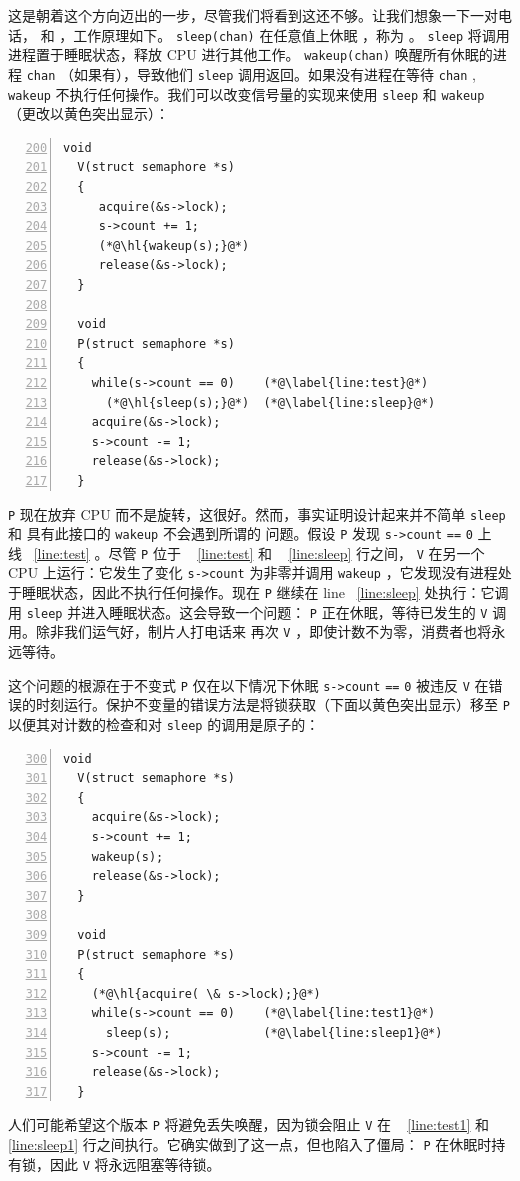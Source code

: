 \documentclass[UTF8]{article}
\begin{document}
这是朝着这个方向迈出的一步，尽管我们将看到这还不够。让我们想象一下一对电话，
        和
        ，工作原理如下。
    \lstinline{sleep(chan)}    在任意值上休眠
        ，称为
        。
    \lstinline{sleep}    将调用进程置于睡眠状态，释放 CPU 进行其他工作。
    \lstinline{wakeup(chan)}    唤醒所有休眠的进程
    \lstinline{chan}   （如果有），导致他们
    \lstinline{sleep}    调用返回。如果没有进程在等待
    \lstinline{chan}    ,
    \lstinline{wakeup}    不执行任何操作。我们可以改变信号量的实现来使用
    \lstinline{sleep}    和
    \lstinline{wakeup}   （更改以黄色突出显示）：
    \begin{lstlisting}[numbers=left,firstnumber=200]
  void
  V(struct semaphore *s)
  {
     acquire(&s->lock);
     s->count += 1;
     (*@\hl{wakeup(s);}@*)
     release(&s->lock);
  }
  
  void
  P(struct semaphore *s)
  {
    while(s->count == 0)    (*@\label{line:test}@*)
      (*@\hl{sleep(s);}@*)  (*@\label{line:sleep}@*)
    acquire(&s->lock);
    s->count -= 1;
    release(&s->lock);
  }
\end{lstlisting}     

   \lstinline{P}    现在放弃 CPU 而不是旋转，这很好。然而，事实证明设计起来并不简单
    \lstinline{sleep}    和
 具有此接口的    \lstinline{wakeup}    不会遇到所谓的        问题。假设
    \lstinline{P}    发现
    \lstinline{s->count}   
    \lstinline{==}   
    \lstinline{0}    上线~    \ref{line:test}    。尽管
    \lstinline{P}    位于 ~    \ref{line:test}    和 ~    \ref{line:sleep}    行之间，
    \lstinline{V}    在另一个 CPU 上运行：它发生了变化
    \lstinline{s->count}    为非零并调用
    \lstinline{wakeup}    ，它发现没有进程处于睡眠状态，因此不执行任何操作。现在
    \lstinline{P}    继续在 line~    \ref{line:sleep}    处执行：它调用
    \lstinline{sleep}    并进入睡眠状态。这会导致一个问题：
    \lstinline{P}    正在休眠，等待已发生的    \lstinline{V}    调用。除非我们运气好，制片人打电话来
 再次    \lstinline{V}   ，即使计数不为零，消费者也将永远等待。  

这个问题的根源在于不变式
    \lstinline{P}    仅在以下情况下休眠
    \lstinline{s->count}   
    \lstinline{==}   
    \lstinline{0}    被违反
    \lstinline{V}    在错误的时刻运行。保护不变量的错误方法是将锁获取（下面以黄色突出显示）移至
    \lstinline{P}    以便其对计数的检查和对    \lstinline{sleep}    的调用是原子的：
    \begin{lstlisting}[numbers=left,firstnumber=300]
  void
  V(struct semaphore *s)
  {
    acquire(&s->lock);
    s->count += 1;
    wakeup(s);
    release(&s->lock);
  }
  
  void
  P(struct semaphore *s)
  {
    (*@\hl{acquire( \& s->lock);}@*)
    while(s->count == 0)    (*@\label{line:test1}@*)
      sleep(s);             (*@\label{line:sleep1}@*)
    s->count -= 1;
    release(&s->lock);
  }
\end{lstlisting}    人们可能希望这个版本
    \lstinline{P}    将避免丢失唤醒，因为锁会阻止
    \lstinline{V}    在 ~    \ref{line:test1}    和 ~    \ref{line:sleep1}    行之间执行。它确实做到了这一点，但也陷入了僵局：
    \lstinline{P}    在休眠时持有锁，因此    \lstinline{V}    将永远阻塞等待锁。  
\end{document}

